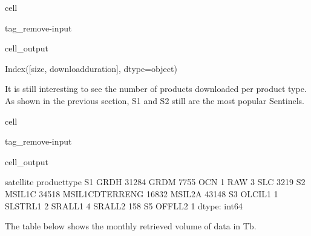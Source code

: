 \documentclass[letterpaper,10pt,english]{jupyterBook}
\begin{document}
\begin{sphinxuseclass}{cell}
\begin{sphinxuseclass}{tag_remove-input}\begin{sphinxVerbatimOutput}

\begin{sphinxuseclass}{cell_output}
\begin{sphinxVerbatim}[commandchars=\\\{\}]
Index([\PYGZsq{}size\PYGZsq{}, \PYGZsq{}download\PYGZus{}duration\PYGZsq{}], dtype=\PYGZsq{}object\PYGZsq{})
\end{sphinxVerbatim}

\noindent{}

\end{sphinxuseclass}\end{sphinxVerbatimOutput}

\end{sphinxuseclass}
\end{sphinxuseclass}
\sphinxAtStartPar
It is still interesting to see the number of products downloaded per product type. As shown in the previous section, S1 and S2 still are the most popular Sentinels.

\begin{sphinxuseclass}{cell}
\begin{sphinxuseclass}{tag_remove-input}\begin{sphinxVerbatimOutput}

\begin{sphinxuseclass}{cell_output}
\begin{sphinxVerbatim}[commandchars=\\\{\}]
satellite  product\PYGZus{}type   
S1         GRDH               31284
           GRDM                7755
           OCN                    1
           RAW                    3
           SLC                 3219
S2         MSIL1C             34518
           MSIL1C\PYGZus{}DTERRENG    16832
           MSIL2A             43148
S3         OLCI\PYGZus{}L1                1
           SLSTR\PYGZus{}L1               2
           SRAL\PYGZus{}L1                4
           SRAL\PYGZus{}L2              158
S5         OFFL\PYGZus{}L2                1
dtype: int64
\end{sphinxVerbatim}

\end{sphinxuseclass}\end{sphinxVerbatimOutput}

\end{sphinxuseclass}
\end{sphinxuseclass}
\sphinxAtStartPar
The table below shows the monthly retrieved volume of data in Tb.
\end{document}
